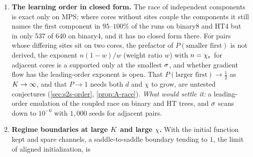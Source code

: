 \begin{enumerate}[label=\arabic*.,leftmargin=*,itemsep=4pt]
    ones), why HT routes with $k=5$ do not stall from small initialization (0 of 144 HT4 runs), and why
    spare channels protect only ends whose own bond has them (\cref{sec:s2s-failure}). Open: from $k=6$ on,
    three-core clusters of inner route cores are a further death channel that the criterion omits, and
    whether a route with one dying end escapes (after $\propto\isc^{-(2k-6)}$) is a \conjecture, contradicted at
    $k=6$ by one gradient-flow run; the odeco traps are predicted only from the state after the second
    escape; spare
    channels raise the stalls on routes whose ends are both capped, reproduced per run but without an
    isolated mechanism; balanced initialization removes dead routes yet delays some escapes by $10^5$ or
    more; and whether the odeco runs at $\Kc=7,8$ that end with live route ends face long plateaus or slowly
    dying routes is a \conjecture{} (from fan-in initialization most stalls of the regime map are dead
    routes). One route (MPS8, $D=\{1,5\}$, from the saddle) is steeper than predicted ($3.67\pm0.20$ against
    $3$), with no established mechanism. \emph{What would settle it:} the cluster channel added to the reduced
    flow and tested at $k=6$--$8$, a $\isc$-free model of the second odeco plateau, and long runs continued from pinned states.
  \item \textbf{The learning order in closed form.} The race of independent components is exact only on
    MPS; where cores without sites couple the components it still names the first component in
    $95$--$100\%$ of the runs on binary8 and HT4 but in only 537 of 640 on binary4, and it has no closed
    form there. For pairs whose differing sites sit on two cores, the prefactor of $P(\text{smaller
    first})$ is not derived, the exponent $n(1-w)/w$ (weight ratio $w$) with $n=\chi_{e}$ for adjacent cores
    is a \conjecture{} supported only at the smallest $\isc$, and whether gradient flow has the
    leading-order exponent is open. That $P(\text{larger first})\to\frac12$ as $K\to\infty$, and that
    $P\to1$ needs both $d$ and $\chi$ to grow, are untested conjectures (\cref{sec:s2s-order},
    \cref{prop:A-race}). \emph{What would settle it:} a leading-order emulation of the coupled race on
    binary and HT trees, and $\isc$ scans down to $10^{-6}$ with $1{,}000$ seeds for adjacent pairs.
  \item \textbf{Regime boundaries at large $K$ and large $\chi$.} With the initial function kept and
    spare channels, a saddle-to-saddle boundary tending to $1$, the limit of aligned initialization, is

\end{enumerate}
